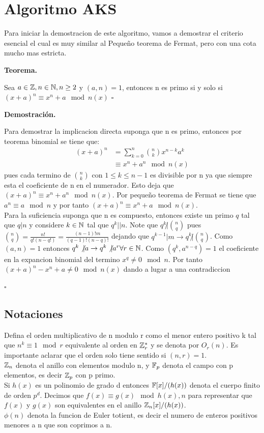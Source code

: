 \documentclass{article}
\newenvironment{dem}{\par\noindent\textbf{Demostración.}\par}{\hfill$\square$\par}
\newenvironment{teo}{\par\noindent\textbf{Teorema.}\par}{\hfill$\square$\par}
\begin{document}
\section{Algoritmo AKS}

Para iniciar la demostracion de este algoritmo, vamos a demostrar el criterio esencial el cual
es muy similar al Pequeño teorema de Fermat, pero con una cota mucho mas estricta.\\
\begin{teo}
    Sea $a\in \mathbb{Z}, n\in \mathbb{N}, n\geq 2$ y $(a,n)=1$, entonces n es primo si y solo si $(x+a)^n \equiv x^n + a \mod n(x)$
\end{teo}

\begin{dem}
    Para demostrar la implicacion directa suponga que n es primo, entonces por teorema binomial se tiene que:
    \begin{align}
        (x+a)^n &= \sum_{k=0}^n \binom{n}{k} x^{n-k}a^k\\
        &\equiv x^n + a^n \mod n(x)
    \end{align}
pues cada termino de $\binom{n}{k}$ con $1\leq k \leq n-1$ es divisible por n ya que siempre esta el coeficiente de n en el numerador.
Esto deja que $(x+a)^n \equiv x^n + a^n \mod n(x)$. Por pequeño teorema de Fermat se tiene que $a^n \equiv a \mod n$ y por tanto $(x+a)^n \equiv x^n + a \mod n(x)$.\\
Para la suficiencia suponga que n es compuesto, entonces existe un primo $q$ tal que $q|n$ y considere $k\in \mathbb{N}$ tal que $q^k||n$. Note que $q^k \not| \binom{n}{q}$ pues 
$\binom{n}{q}=\frac{n!}{q!(n-q!)}=\frac{(n-1)!m}{(q-1)!(n-q)!}$ dejando que $q^{k-1}|m \to q^k\not|\binom{n}{q}$. Como $(a,n)=1$ entonces $q^k\not|a \to q^k\not|a^r \forall r\in \mathbb{N}$. 
Como $(q^k,a^{n-q})=1$ el coeficiente en la expancion binomial del termino $x^q\neq 0 \mod n$. Por tanto $(x+a)^n - x^n + a \neq 0 \mod n(x)$ dando a lugar a una contradiccion

\end{dem}

\subsection{Notaciones}
Defina el orden multiplicativo de n modulo r como el menor entero positivo k tal que $n^k \equiv 1 \mod r$ equivalente al orden en $\mathbb{Z}_r^*$ y se denota por $O_r(n)$.
Es importante aclarar que el orden solo tiene sentido si $(n,r)=1$.\\
$\mathbb{Z}_n$ denota el anillo con elementos modulo n, y $\mathbb{F}_p$ denota el campo con p elementos, es decir $\mathbb{Z}_p$ con p primo.\\
Si $h(x)$ es un polinomio de grado d entonces $\mathbb{F}[x]/(h(x))$ denota el cuerpo finito de orden $p^d$. Decimos que $f(x) \equiv g(x) \mod h(x), n$ para representar que $f(x)$ y $g(x)$ son equivalentes en el anillo $\mathbb{Z}_n[x]/(h(x))$.\\
$\phi(n)$ denota la funcion de Euler totient, es decir el numero de enteros positivos menores a n que son coprimos a n.\\
\end{document}
